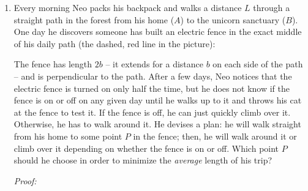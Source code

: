 \documentclass[12pt]{exam}
\newcommand{\vv}{\vspace{.1cm}}
\begin{document}
\begin{enumerate}

\item Every morning Neo packs his backpack and walks a distance $L$ through a straight path in the forest from his home ($A$) to the unicorn sanctuary ($B$).  One day he discovers someone has built an electric fence in the exact middle of his daily path (the dashed, red line in the picture):
\begin{center}
\end{center}
The fence has length $2b$ --  it extends for a distance $b$ on each side of the path -- and is perpendicular to the path.  After a few days, Neo notices that the electric fence is turned on only half the time, but he does not know if the fence is on or off on any given day until he walks up to it and throws his cat at the fence to test it.  If the fence is off, he can just quickly climb over it.  Otherwise, he has to walk around it.  He devises a plan: he will walk straight from his home to some point $P$ in the fence; then, he will walk around it or climb over it depending on whether the fence is on or off.    Which point $P$ should he choose in order to minimize the \emph{average} length of his trip?


\vv

\emph{Proof:}

\vv

\begin{center}
\end{center}


\end{enumerate}
\end{document}
